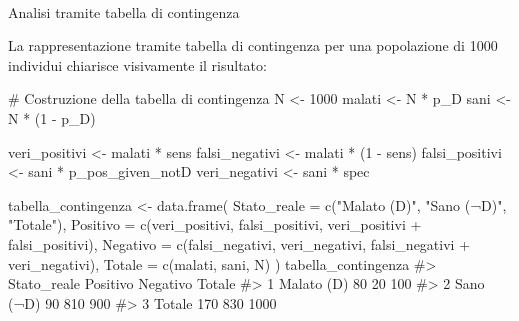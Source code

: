 \documentclass[
  letterpaper,
  DIV=11,
  numbers=noendperiod,
  oneside]{scrreprt}
\makeatletter
\let\oldparagraph\paragraph
\renewcommand{\paragraph}{
    \@ifstar
      \xxxParagraphStar
      \xxxParagraphNoStar
  }
\newcommand{\xxxParagraphStar}[1]{\oldparagraph*{#1}\mbox{}}
\newcommand{\xxxParagraphNoStar}[1]{\oldparagraph{#1}\mbox{}}
\newenvironment{Shaded}{\begin{snugshade}}{\end{snugshade}}
\newcommand{\AttributeTok}[1]{\textcolor[rgb]{0.40,0.45,0.13}{#1}}
\newcommand{\CommentTok}[1]{\textcolor[rgb]{0.37,0.37,0.37}{#1}}
\newcommand{\DecValTok}[1]{\textcolor[rgb]{0.68,0.00,0.00}{#1}}
\newcommand{\FunctionTok}[1]{\textcolor[rgb]{0.28,0.35,0.67}{#1}}
\newcommand{\NormalTok}[1]{\textcolor[rgb]{0.00,0.23,0.31}{#1}}
\newcommand{\OtherTok}[1]{\textcolor[rgb]{0.00,0.23,0.31}{#1}}
\newcommand{\SpecialCharTok}[1]{\textcolor[rgb]{0.37,0.37,0.37}{#1}}
\newcommand{\StringTok}[1]{\textcolor[rgb]{0.13,0.47,0.30}{#1}}
\theoremstyle{definition}
\theoremstyle{plain}
\theoremstyle{definition}
\theoremstyle{remark}
\makeatother
\begin{document}
\paragraph{Analisi tramite tabella di
contingenza}\label{analisi-tramite-tabella-di-contingenza}

La rappresentazione tramite tabella di contingenza per una popolazione
di 1000 individui chiarisce visivamente il risultato:

\begin{Shaded}
\begin{Highlighting}[]
\CommentTok{\# Costruzione della tabella di contingenza}
\NormalTok{N }\OtherTok{\textless{}{-}} \DecValTok{1000}
\NormalTok{malati }\OtherTok{\textless{}{-}}\NormalTok{ N }\SpecialCharTok{*}\NormalTok{ p\_D}
\NormalTok{sani }\OtherTok{\textless{}{-}}\NormalTok{ N }\SpecialCharTok{*}\NormalTok{ (}\DecValTok{1} \SpecialCharTok{{-}}\NormalTok{ p\_D)}

\NormalTok{veri\_positivi }\OtherTok{\textless{}{-}}\NormalTok{ malati }\SpecialCharTok{*}\NormalTok{ sens}
\NormalTok{falsi\_negativi }\OtherTok{\textless{}{-}}\NormalTok{ malati }\SpecialCharTok{*}\NormalTok{ (}\DecValTok{1} \SpecialCharTok{{-}}\NormalTok{ sens)}
\NormalTok{falsi\_positivi }\OtherTok{\textless{}{-}}\NormalTok{ sani }\SpecialCharTok{*}\NormalTok{ p\_pos\_given\_notD}
\NormalTok{veri\_negativi }\OtherTok{\textless{}{-}}\NormalTok{ sani }\SpecialCharTok{*}\NormalTok{ spec}

\NormalTok{tabella\_contingenza }\OtherTok{\textless{}{-}} \FunctionTok{data.frame}\NormalTok{(}
  \AttributeTok{Stato\_reale =} \FunctionTok{c}\NormalTok{(}\StringTok{"Malato (D)"}\NormalTok{, }\StringTok{"Sano (¬D)"}\NormalTok{, }\StringTok{"Totale"}\NormalTok{),}
  \AttributeTok{Positivo =} \FunctionTok{c}\NormalTok{(veri\_positivi, falsi\_positivi, veri\_positivi }\SpecialCharTok{+}\NormalTok{ falsi\_positivi),}
  \AttributeTok{Negativo =} \FunctionTok{c}\NormalTok{(falsi\_negativi, veri\_negativi, falsi\_negativi }\SpecialCharTok{+}\NormalTok{ veri\_negativi),}
  \AttributeTok{Totale =} \FunctionTok{c}\NormalTok{(malati, sani, N)}
\NormalTok{)}
\NormalTok{tabella\_contingenza}
\CommentTok{\#\textgreater{}   Stato\_reale Positivo Negativo Totale}
\CommentTok{\#\textgreater{} 1  Malato (D)       80       20    100}
\CommentTok{\#\textgreater{} 2   Sano (¬D)       90      810    900}
\CommentTok{\#\textgreater{} 3      Totale      170      830   1000}
\end{Highlighting}
\end{Shaded}
\end{document}
